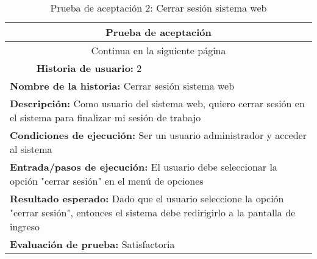 \begin{longtable}{|p{6.7cm}|p{6.7cm}|}
    \caption{Prueba de aceptación 2: Cerrar sesión sistema web} \label{tab:prueba-2}
    \\
    \hline
    \multicolumn{2}{|c|}{\textbf{Prueba de aceptación}}                                                                                                                                \\
    \hline

    \endfirsthead

    \hline
    \endhead

    \hline
    \multicolumn{2}{|c|}{{Continua en la siguiente página}}                                                                                                                            \\
    \hline
    \endfoot

    \hline
    \endlastfoot
    \multicolumn{1}{|p{6.7cm}|}{\textbf{Número} 2 } & \multicolumn{1}{|p{6.7cm}|}{\textbf{Historia de usuario:} 2}                                                                     \\
    \hline
    \multicolumn{2}{|p{13.4cm}|}{\textbf{Nombre de la historia:} Cerrar sesión sistema web }                                                                                           \\
    \hline
    \multicolumn{2}{|p{13.4cm}|}{\textbf{Descripción:}  Como usuario del sistema web, quiero cerrar sesión en el sistema para finalizar mi sesión de trabajo}                          \\
    \hline
    \multicolumn{2}{|p{13.4cm}|}{\textbf{Condiciones de ejecución:} Ser un usuario administrador y acceder al sistema}                                                                 \\
    \hline
    \multicolumn{2}{|p{13.4cm}|}{\textbf{Entrada/pasos de ejecución:} El usuario debe seleccionar la opción "cerrar sesión" en el menú de opciones}                                    \\
    \hline
    \multicolumn{2}{|p{13.4cm}|}{\textbf{Resultado esperado:} Dado que el usuario seleccione la opción "cerrar sesión", entonces el sistema debe redirigirlo a la pantalla de ingreso} \\
    \hline
    \multicolumn{2}{|p{13.4cm}|}{\textbf{Evaluación de prueba:} Satisfactoria}                                                                                                         \\
    \hline
\end{longtable}


